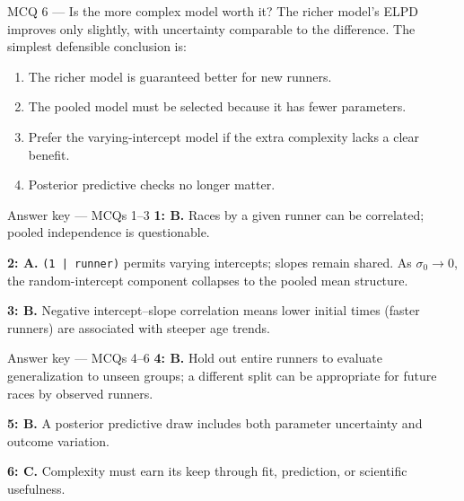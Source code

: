 \documentclass[aspectratio=43,11pt]{beamer}
\begin{document}
\begin{frame}{MCQ 6 --- Is the more complex model worth it?}
The richer model's ELPD improves only slightly, with uncertainty comparable to the difference. The simplest defensible conclusion is:
\begin{enumerate}
\item[A.] The richer model is guaranteed better for new runners.
\item[B.] The pooled model must be selected because it has fewer parameters.
\item[C.] Prefer the varying-intercept model if the extra complexity lacks a clear benefit.
\item[D.] Posterior predictive checks no longer matter.
\end{enumerate}
\end{frame}

\appendix

\begin{frame}{Answer key --- MCQs 1--3}
\textbf{1: B.} Races by a given runner can be correlated; pooled independence is questionable.\par\vspace{3mm}
\textbf{2: A.} \texttt{(1 | runner)} permits varying intercepts; slopes remain shared. As $\sigma_0\to0$, the random-intercept component collapses to the pooled mean structure.\par\vspace{3mm}
\textbf{3: B.} Negative intercept--slope correlation means lower initial times (faster runners) are associated with steeper age trends.
\end{frame}

\begin{frame}{Answer key --- MCQs 4--6}
\textbf{4: B.} Hold out entire runners to evaluate generalization to unseen groups; a different split can be appropriate for future races by observed runners.\par\vspace{3mm}
\textbf{5: B.} A posterior predictive draw includes both parameter uncertainty and outcome variation.\par\vspace{3mm}
\textbf{6: C.} Complexity must earn its keep through fit, prediction, or scientific usefulness.
\end{frame}
\end{document}
